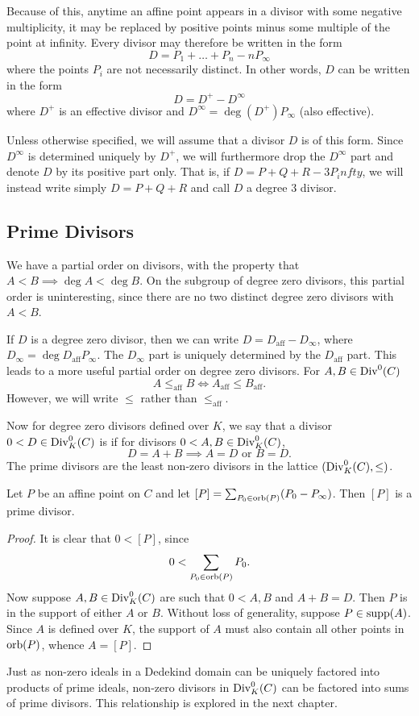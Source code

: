 Because of this, anytime an affine point appears in a divisor with some negative multiplicity,
it may be replaced by positive points minus some multiple of the point at infinity.
Every divisor may therefore be written in the form
  \[ D = P_1 + \ldots + P_n - nP_\infty \]
where the points $P_i$ are not necessarily distinct.
In other words, $D$ can be written in the form
  \[ D = D^+ - D^\infty \]
where $D^+$ is an effective divisor and $D^\infty = \deg(D^+)P_\infty$ (also effective).

Unless otherwise specified, we will assume that a divisor $D$ is of this form.
Since $D^\infty$ is determined uniquely by $D^+$,
we will furthermore drop the $D^\infty$ part and denote $D$ by its positive part only.
That is, if $D = P + Q + R - 3P_infty$, we will instead write simply $D = P + Q + R$ and call $D$ a degree 3 divisor.






\subsection{Prime Divisors}

We have a partial order on divisors, with the property that $A < B \implies \deg A < \deg B$.
On the subgroup of degree zero divisors, this partial order is uninteresting, since there are no two distinct degree zero divisors with $A < B$.

If $D$ is a degree zero divisor, then we can write $D = D_{\text{aff}} - D_\infty$, where $D_\infty = \deg D_{\text{aff}}P_\infty$.
The $D_\infty$ part is uniquely determined by the $D_{\text{aff}}$ part.
This leads to a more useful partial order on degree zero divisors.
For $A, B \in \operatorname{Div}^0(C)$
  \[ A \leq_{\text{aff}} B \iff A_{\text{aff}} \leq B_{\text{aff}}. \]
However, we will write $\leq$ rather than $\leq_{\text{aff}}$.

Now for degree zero divisors defined over $K$, we say that a divisor $0 < D \in \operatorname{Div}_K^0(C)$ is 
if for divisors $0 < A, B \in \operatorname{Div}_K^0(C)$,
  \[ D = A + B \implies A = D \text{ or } B = D. \]
The prime divisors are the least non-zero divisors in the lattice $(\operatorname{Div}_K^0(C), \leq)$.

\begin{proposition}
  Let $P$ be an affine point on $C$ and let $[P] = \sum_{P_0 \in \operatorname{orb}(P)}(P_0 - P_\infty)$.
  Then $[P]$ is a prime divisor.
\end{proposition}
\begin{proof}
  It is clear that $0 < [P]$, since
  \[ 0 < \sum_{P_0 \in \operatorname{orb}(P)}P_0. \]
  Now suppose $A, B \in \operatorname{Div}_K^0(C)$ are such that $0 < A, B$ and $A + B = D$.
  Then $P$ is in the support of either $A$ or $B$.
  Without loss of generality, suppose $P \in \operatorname{supp}(A)$.
  Since $A$ is defined over $K$, the support of $A$ must also contain all other points in $\operatorname{orb}(P)$,
  whence $A = [P]$.
\end{proof}

Just as non-zero ideals in a Dedekind domain can be uniquely factored into products of prime ideals,
non-zero divisors in $\operatorname{Div}_K^0(C)$ can be factored into sums of prime divisors.
This relationship is explored in the next chapter.

